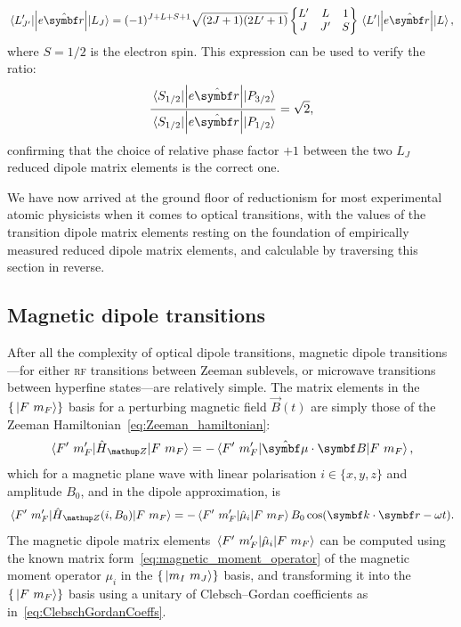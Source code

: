 \begin{align}
\matrixel{L^\prime_{J^\prime}}{\left|e\hat{\vec r}\right|}{L_J} = 
(-1)^{J+L+S+1}\sqrt{(2J+1)(2L^\prime+1)}
\left\{\begin{matrix}
L^\prime & L & 1\\
J & J^\prime & S
\end{matrix}\right\}
\matrixel{L^\prime}{\left|e\hat{\vec r}\right|}{L},
\end{align}
where $S=1/2$ is the electron spin. This expression can be used to verify the ratio:
\begin{align}
\frac
{\matrixel{S_{1/2}}{\left|e\hat{\vec r}\right|}{P_{3/2}}}
{\matrixel{S_{1/2}}{\left|e\hat{\vec r}\right|}{P_{1/2}}} = \sqrt{2},
\end{align}
confirming that the choice of relative phase factor $+1$ between the two $L_J$ reduced dipole matrix elements is the correct one.

We have now arrived at the ground floor of reductionism for most experimental atomic physicists when it comes to optical transitions, with the values of the transition dipole matrix elements resting on the foundation of empirically measured reduced dipole matrix elements, and calculable by traversing this section in reverse.

\subsection{Magnetic dipole transitions}
After all the complexity of optical dipole transitions, magnetic dipole transitions---for either \textsc{rf} transitions between Zeeman sublevels, or microwave transitions between hyperfine states---are relatively simple. The matrix elements in the $\{\ket{F\ m_F}\}$ basis for a perturbing magnetic field $\vec B(t)$ are simply those of the Zeeman Hamiltonian~\eqref{eq:Zeeman_hamiltonian}:
\begin{align}
\matrixel{F^\prime\ m_F^\prime}{\hat H_\up{Z}}{F\ m_F}
=
-\matrixel{F^\prime\ m_F^\prime}{\hat{\vec\mu}\cdot {\vec B}}{F\ m_F},
\end{align} 
which for a magnetic plane wave with linear polarisation $i\in \{x, y, z\}$ and amplitude $B_0$, and in the dipole approximation, is
\begin{align}
\matrixel{F^\prime\ m_F^\prime}{\hat H_\up{Z}(i, B_0)}{F\ m_F}
=
-\matrixel{F^\prime\ m_F^\prime}{\hat{\mu}_i}{F\ m_F}B_0 \cos(\vec k\cdot \vec r - \omega t).
\end{align}
The magnetic dipole matrix elements $\matrixel{F^\prime\ m_F^\prime}{\hat{\mu}_i}{F\ m_F}$ can be computed using the known matrix form~\eqref{eq:magnetic_moment_operator} of the magnetic moment operator $\mu_i$ in the $\{\ket{m_I\ m_J}\}$ basis, and transforming it into the $\{\ket{F\ m_F}\}$ basis using a unitary of Clebsch--Gordan coefficients as in~\eqref{eq:ClebschGordanCoeffs}.

